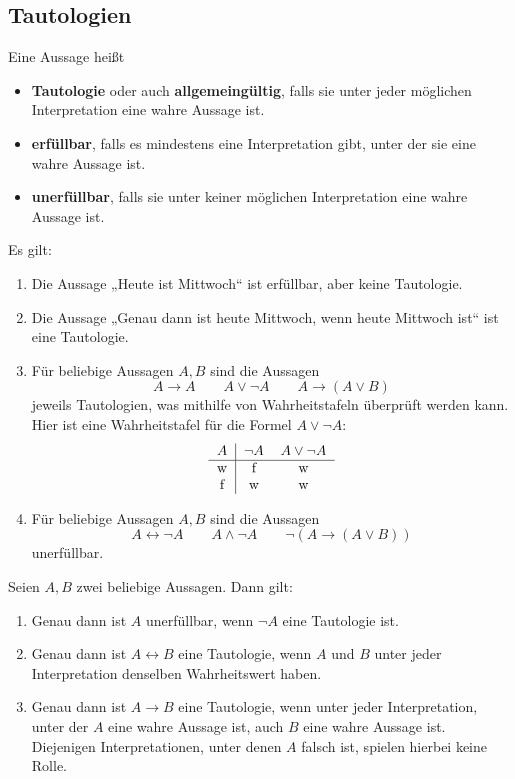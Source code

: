 \subsection*{Tautologien}


\begin{de} 
    Eine Aussage heißt
    \begin{itemize}
        \item \textbf{Tautologie} oder auch \textbf{allgemeingültig}, falls sie unter jeder möglichen Interpretation eine wahre Aussage ist.
        \item \textbf{erfüllbar}, falls es mindestens eine Interpretation gibt, unter der sie eine wahre Aussage ist.
        \item \textbf{unerfüllbar}, falls sie unter keiner möglichen Interpretation eine wahre Aussage ist.
    \end{itemize}
\end{de}


\begin{bsp}
    Es gilt:
    \begin{enumerate}
        \item Die Aussage „Heute ist Mittwoch“ ist erfüllbar, aber keine Tautologie.
        \item Die Aussage „Genau dann ist heute Mittwoch, wenn heute Mittwoch ist“ ist eine Tautologie.
        \item Für beliebige Aussagen $A,B$ sind die Aussagen
            \[ A \to A \qquad A\lor \neg A  \qquad A \to (A\lor B) \]
        jeweils Tautologien, was mithilfe von Wahrheitstafeln überprüft werden kann. Hier ist eine Wahrheitstafel für die Formel $A\lor \neg A$:
        \[\begin{tabular}{c|cc}
            $A$ & $\neg A$ & $A\lor \neg A$ \\
            \hline
            w&f&w\\
            f&w&w
        \end{tabular}\]
        \item Für beliebige Aussagen $A,B$ sind die Aussagen
            \[ A \leftrightarrow \neg A \qquad A\land \neg A \qquad  \neg(A\to (A\lor B))\]
        unerfüllbar.
    \end{enumerate}
\end{bsp}
 
 
\begin{satz} \label{tauto}
    Seien $A,B$ zwei beliebige Aussagen. Dann gilt:
    \begin{enumerate}
        \item Genau dann ist $A$ unerfüllbar, wenn $\neg A$ eine Tautologie ist.
        \item Genau dann ist $A\leftrightarrow B$ eine Tautologie, wenn $A$ und $B$ unter jeder Interpretation denselben Wahrheitswert haben.
        \item Genau dann ist $A\to B$ eine Tautologie, wenn unter jeder Interpretation, unter der $A$ eine wahre Aussage ist, auch $B$ eine wahre Aussage ist. Diejenigen Interpretationen, unter denen $A$ falsch ist, spielen hierbei keine Rolle.
    \end{enumerate}
\end{satz}


